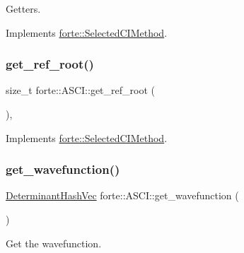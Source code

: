 Getters. 



Implements \mbox{\hyperlink{classforte_1_1_selected_c_i_method_a2c29d8700d6887860850f77b9246ec9f}{forte\+::\+Selected\+C\+I\+Method}}.

\mbox{\label{classforte_1_1_a_s_c_i_aa81094a460d7922927d4ff9f14929ab8}} 
\subsubsection{\texorpdfstring{get\+\_\+ref\+\_\+root()}{get\_ref\_root()}}
{\footnotesize\ttfamily size\+\_\+t forte\+::\+A\+S\+C\+I\+::get\+\_\+ref\+\_\+root (\begin{DoxyParamCaption}{ }\end{DoxyParamCaption})\hspace{0.3cm}{\ttfamily [override]}, {\ttfamily [virtual]}}



Implements \mbox{\hyperlink{classforte_1_1_selected_c_i_method_aa95ed581568b2d580c17ab166e85a11a}{forte\+::\+Selected\+C\+I\+Method}}.

\mbox{\label{classforte_1_1_a_s_c_i_a1d1cb0632d2a03f39b421c2628e784fe}} 
\subsubsection{\texorpdfstring{get\+\_\+wavefunction()}{get\_wavefunction()}}
{\footnotesize\ttfamily \mbox{\hyperlink{classforte_1_1_determinant_hash_vec}{Determinant\+Hash\+Vec}} forte\+::\+A\+S\+C\+I\+::get\+\_\+wavefunction (\begin{DoxyParamCaption}{ }\end{DoxyParamCaption})}



Get the wavefunction. 

\mbox{\label{classforte_1_1_a_s_c_i_a0088675b12258f127476e15226ba822f}} 
